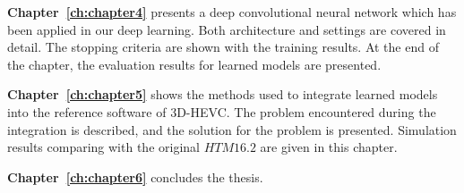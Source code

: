 \textbf{Chapter~\ref{ch:chapter4}} presents a deep convolutional
neural network which has been applied in our deep learning.
Both architecture and settings
are covered in detail.
The stopping criteria are shown with the training results.
At the end of the chapter, the evaluation results for learned models
are presented.

\textbf{Chapter~\ref{ch:chapter5}} 
shows the methods
used to integrate learned models
into the reference software of 3D-HEVC\@.
The problem encountered during the integration is described,
and the solution for the problem is presented.
Simulation results comparing with the original \(HTM16.2\) are given in this
chapter.

\textbf{Chapter~\ref{ch:chapter6}} concludes the thesis.
